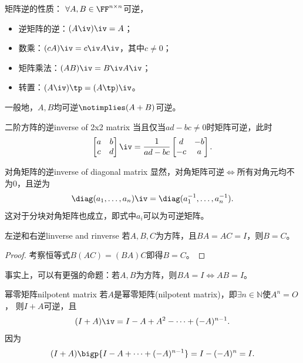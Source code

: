\begin{corollary}
	矩阵逆的性质：
	$\forall A,B\in\FF^{n\times n}$可逆，
	\begin{itemize}
		\item 逆矩阵的逆：$(A\iv)\iv=A$；
		\item 数乘：$(cA)\iv=c\iv A\iv$，其中$c\neq0$；
		\item 矩阵乘法：$(AB)\iv=B\iv A\iv$；
		\item 转置：$(A\iv)\tp=(A\tp)\iv$。
	\end{itemize}
\end{corollary}

\begin{remark}
	一般地，$A,B$均可逆$\notimplies(A+B)$可逆。
\end{remark}

\begin{example}{二阶方阵的逆}{inverse of 2x2 matrix}
	当且仅当$ad-bc\neq0$时矩阵可逆，此时
	\begin{equation}
		\begin{bmatrix}
			a&b\\c&d
		\end{bmatrix}\iv=\frac1{ad-bc}
		\begin{bmatrix}
			d&-b\\
			-c&a
		\end{bmatrix}.
	\end{equation}
\end{example}
\begin{example}{对角矩阵的逆}{inverse of diagonal matrix}
	显然，对角矩阵可逆$\iff$所有对角元均不为0，且逆为
	\begin{align}
		\diag(a_1,\ldots,a_n)\iv=\diag(a_1^{-1},\ldots,a_n^{-1}).
	\end{align}
	这对于分块对角矩阵也成立，即式中$a_i$可以为可逆矩阵。
\end{example}
\begin{theorem}{左逆和右逆}{linverse and rinverse}
	若$A,B,C$为方阵，且$BA=AC=I$，则$B=C$。
\end{theorem}
\begin{proof}
	考察恒等式$B(AC)=(BA)C$即得$B=C$。
\end{proof}
\begin{remark}
	事实上，可以有更强的命题：若$A,B$为方阵，则$BA=I\iff AB=I$。
\end{remark}
\begin{example}{幂零矩阵}{nilpotent matrix}
	若$A$是幂零矩阵(nilpotent matrix)，即$\exists n\in\mathbb N$使$A^n=O$，
	则$I+A$可逆，且
	\[
		(I+A)\iv=I-A+A^2-\cdots+(-A)^{n-1}.
	\]
	因为
	\[
		(I+A)\bigp{I-A+\cdots+(-A)^{n-1}}=I-(-A)^n=I.
	\]
\end{example}

